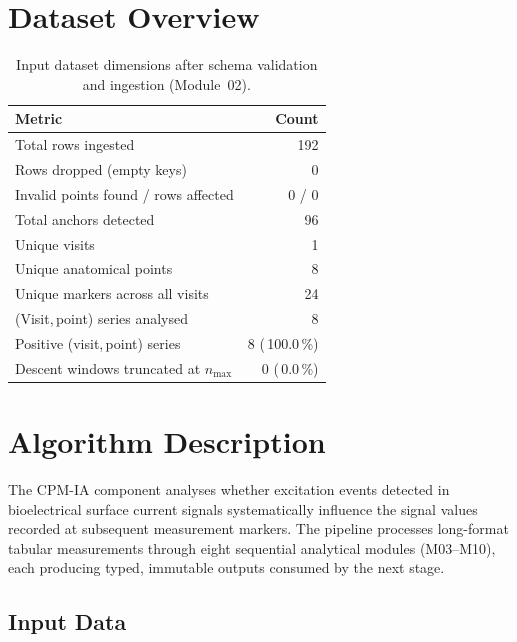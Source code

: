 \documentclass[a4paper,11pt]{article}
\begin{document}
\section{Dataset Overview}

\begin{table}[h!]
\centering
\small
\caption{Input dataset dimensions after schema validation and ingestion (Module~02).}
\begin{tabular}{lr}
\toprule
\textbf{Metric} & \textbf{Count} \\
\midrule
Total rows ingested                        & 192 \\
Rows dropped (empty keys)                  & 0 \\
Invalid points found / rows affected       & 0 / 0 \\
Total anchors detected                     & 96 \\
Unique visits                          & 1 \\
Unique anatomical points               & 8 \\
Unique markers across all visits       & 24 \\
(Visit,\,point) series analysed        & 8 \\
Positive (visit,\,point) series        & 8 (\,100.0\,\%) \\
Descent windows truncated at $n_{\max}$ & 0 (\,0.0\,\%) \\
\bottomrule
\end{tabular}
\end{table}

\section{Algorithm Description}

The CPM-IA component analyses whether excitation events detected in bioelectrical surface
current signals systematically influence the signal values recorded at subsequent measurement
markers. The pipeline processes long-format tabular measurements through eight sequential
analytical modules (M03--M10), each producing typed, immutable outputs consumed by the next
stage.

\subsection{Input Data}
\end{document}
